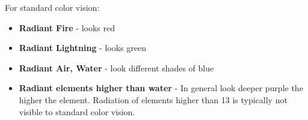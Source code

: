 For standard color vision:
\begin{itemize}
	\item \textbf{Radiant Fire} - looks red
	\item \textbf{Radiant Lightning} - looks green
	\item \textbf{Radiant Air, Water} - look different shades of blue
	\item \textbf{Radiant elements higher than water} - In general look deeper purple the higher the element. Radiation of elements higher than 13 is typically not visible to standard color vision.
\end{itemize}

